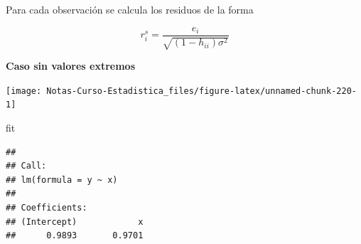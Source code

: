 \documentclass[
  12pt,
]{book}
\newenvironment{Shaded}{\begin{snugshade}}{\end{snugshade}}
\newcommand{\DataTypeTok}[1]{\textcolor[rgb]{0.13,0.29,0.53}{#1}}
\newcommand{\DecValTok}[1]{\textcolor[rgb]{0.00,0.00,0.81}{#1}}
\newcommand{\FloatTok}[1]{\textcolor[rgb]{0.00,0.00,0.81}{#1}}
\newcommand{\KeywordTok}[1]{\textcolor[rgb]{0.13,0.29,0.53}{\textbf{#1}}}
\newcommand{\NormalTok}[1]{#1}
\newcommand{\OperatorTok}[1]{\textcolor[rgb]{0.81,0.36,0.00}{\textbf{#1}}}
\newcommand{\StringTok}[1]{\textcolor[rgb]{0.31,0.60,0.02}{#1}}
\theoremstyle{definition}
\theoremstyle{definition}
\theoremstyle{definition}
\theoremstyle{remark}
\begin{document}
Para cada observación se calcula los residuos de la forma

\begin{equation*}
r_{i}^{s} = \frac{e_i}{\sqrt{(1-h_{ii}) \sigma^{2}}}
\end{equation*}

\textbf{Caso sin valores extremos}

\begin{Shaded}
\end{Shaded}

\begin{center}\texttt{[image: Notas-Curso-Estadistica\_files/figure-latex/unnamed-chunk-220-1]} \end{center}

\begin{Shaded}
\begin{Highlighting}[]
\NormalTok{fit}
\end{Highlighting}
\end{Shaded}

\begin{verbatim}
## 
## Call:
## lm(formula = y ~ x)
## 
## Coefficients:
## (Intercept)            x  
##      0.9893       0.9701
\end{verbatim}
\end{document}
